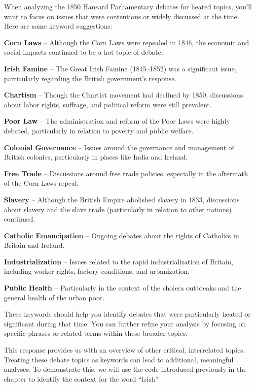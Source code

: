 \documentclass[
]{article}
\begin{document}
\begin{tcolorbox}[colback=green!5!white, colframe=green!75!black, title=ChatGPT-4o Response]
When analyzing the 1850 Hansard Parliamentary debates for heated topics, you'll want to focus on issues that were contentious or widely discussed at the time. Here are some keyword suggestions:

\textbf{Corn Laws} – Although the Corn Laws were repealed in 1846, the economic and social impacts continued to be a hot topic of debate.

\textbf{Irish Famine} – The Great Irish Famine (1845–1852) was a significant issue, particularly regarding the British government's response.

\textbf{Chartism} – Though the Chartist movement had declined by 1850, discussions about labor rights, suffrage, and political reform were still prevalent.

\textbf{Poor Law} – The administration and reform of the Poor Laws were highly debated, particularly in relation to poverty and public welfare.

\textbf{Colonial Governance} – Issues around the governance and management of British colonies, particularly in places like India and Ireland.

\textbf{Free Trade} – Discussions around free trade policies, especially in the aftermath of the Corn Laws repeal.

\textbf{Slavery} – Although the British Empire abolished slavery in 1833, discussions about slavery and the slave trade (particularly in relation to other nations) continued.

\textbf{Catholic Emancipation} – Ongoing debates about the rights of Catholics in Britain and Ireland.

\textbf{Industrialization} – Issues related to the rapid industrialization of Britain, including worker rights, factory conditions, and urbanization.

\textbf{Public Health} – Particularly in the context of the cholera outbreaks and the general health of the urban poor.
 
These keywords should help you identify debates that were particularly heated or significant during that time. You can further refine your analysis by focusing on specific phrases or related terms within these broader topics.
\end{tcolorbox}

This response provides us with an overview of other critical,
interrelated topics. Treating these debate topics as keywords can lead
to additional, meaningful analyses. To demonstrate this, we will use the
code introduced previously in the chapter to identify the context for
the word ``Irish''
\end{document}
